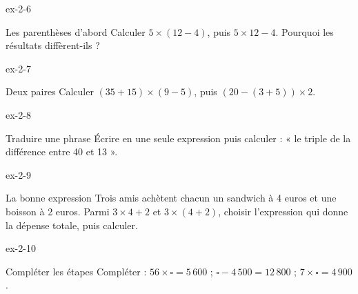 \begin{blocLivre}{ex-2-6}\begin{exercice}[2]{Les parenthèses d’abord}
Calculer $5\times(12-4)$, puis $5\times12-4$. Pourquoi les résultats diffèrent-ils ?
\end{exercice}\end{blocLivre}
\begin{blocLivre}{ex-2-7}\begin{exercice}[2]{Deux paires}
Calculer $(35+15)\times(9-5)$, puis $(20-(3+5))\times2$.
\end{exercice}\end{blocLivre}
\begin{blocLivre}{ex-2-8}\begin{exercice}[2]{Traduire une phrase}
Écrire en une seule expression puis calculer : « le triple de la différence entre 40 et 13 ».
\end{exercice}\end{blocLivre}
\begin{blocLivre}{ex-2-9}\begin{exercice}[2]{La bonne expression}
Trois amis achètent chacun un sandwich à 4 euros et une boisson à 2 euros. Parmi $3\times4+2$ et $3\times(4+2)$, choisir l’expression qui donne la dépense totale, puis calculer.
\end{exercice}\end{blocLivre}
\begin{blocLivre}{ex-2-10}\begin{exercice}[2]{Compléter les étapes}
Compléter : $56\times\square=5\,600$ ; $\square-4\,500=12\,800$ ; $7\times\square=4\,900$.
\end{exercice}\end{blocLivre}

